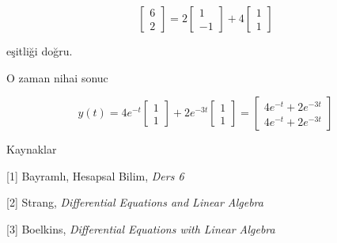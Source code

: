 \documentclass[12pt,fleqn]{article}\usepackage{../../common}
\begin{document}
$$
\left[\begin{array}{r}
6 \\ 2
\end{array}\right] =
2 
\left[\begin{array}{r}
1 \\ -1
\end{array}\right] +
4 
\left[\begin{array}{r}
1 \\ 1
\end{array}\right] 
$$

eşitliği doğru. 

O zaman nihai sonuc

$$
y(t) =
4 e^{-t}
\left[\begin{array}{r}
1 \\ 1
\end{array}\right]  +
2 e^{-3t}
\left[\begin{array}{r}
1 \\ 1
\end{array}\right] =
\left[\begin{array}{r}
4 e^{-t} + 2 e^{-3t} \\
4 e^{-t} + 2 e^{-3t}
\end{array}\right]
$$

Kaynaklar

[1] Bayramlı, Hesapsal Bilim, {\em Ders 6}

[2] Strang, {\em Differential Equations and Linear Algebra}

[3] Boelkins, {\em Differential Equations with Linear Algebra}
\end{document}
